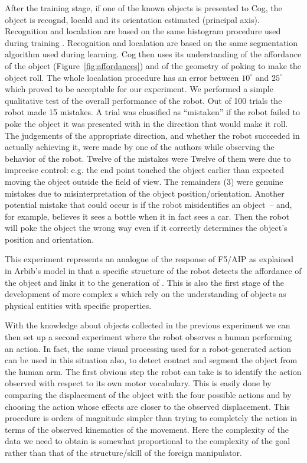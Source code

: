 After the training stage, if one of the known objects is presented to Cog, the 
object is recogn\ize{}d, local\ize{}d and its orientation estimated (principal 
axis). 
\ifrevised
Recognition and local\iz{}ation are based on the same
\ahhcolor{} histogram procedure used during training \cite{swain91color}.
\else
Recognition and local\iz{}ation are based on the same \ahhcolor{} 
segmentation algorithm used during learning. 
\fi
Cog then uses its 
understanding of the affordance of the object (Figure~\ref{fig:affordances}) 
and of the geometry of poking to make the object roll. 
The whole local\iz{}ation 
procedure has an error between $10^{\circ}$ and $25^{\circ}$ which proved 
to be acceptable for our experiment. We performed a simple qualitative test of 
the overall performance of the robot. Out of 100 trials the robot made 15 
mistakes. 
\ifrevised
A trial was classified as ``mistaken'' if the robot failed to poke
the object it was presented with in the direction that would 
make it roll.
The judgements of the appropriate direction, and whether the robot
succeeded in actually achieving it, were made by one
of the authors while observing the behavior of the robot.
Twelve of the mistakes were 
\else
Twelve of them were 
\fi
due to imprecise control: e.g. the end point 
touched the object earlier than expected moving the object
outside the field of 
view. The remainders (3) were genuine mistakes due to misinterpretation of 
the object position/orientation.
%
\ifrevised
%
Another potential mistake that could occur is if the robot
misidentifies an object~-- and, for example, believes it sees a bottle
when it in fact sees a car.  Then the robot will poke the object the
wrong way even if it correctly determines the object's position and
orientation.
%
\fi


This experiment represents an analogue of the response of F5/AIP as 
explained in Arbib's model \cite{fagg-arbib-1998} in that a specific 
structure of the robot detects the affordance of the object and links 
it to the generation of \ahhbehavior{}. This is also the first stage of 
the development of more complex \ahhbehavior{}s which rely on the understanding 
of objects as physical entities with specific properties.

With the knowledge about objects collected in the previous experiment
we can then set up a second experiment where the robot observes a human performing an action. In fact, the same visual processing 
used for \ahhanalyzing{} a robot-generated action can be used in this situation also, to detect contact and 
segment the object from the human arm. 
The first obvious step the robot can take is to identify the action 
observed with respect to its own motor vocabulary. This is easily done by 
comparing the displacement of the object with the four possible actions and 
by choosing the action whose effects are closer to the observed displacement. 
This procedure is orders of magnitude simpler than trying to completely 
\ahhcharacterize{} the action in terms of the observed kinematics of the movement. 
Here the complexity of the data we need to obtain is somewhat proportional 
to the complexity of the goal rather than that of the structure/skill of 
the foreign manipulator.

